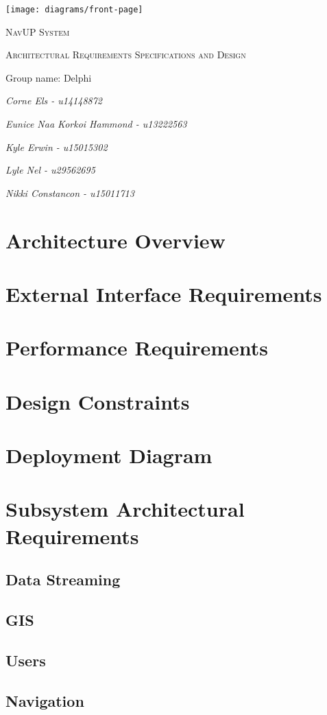 \documentclass{article}
\begin{document}
\begin{titlepage}
	\centering
	\texttt{[image: diagrams/front-page]}
	\vfill
	{\scshape\LARGE NavUP System\par}
	\vfill
	{\scshape\Large Architectural Requirements Specifications and Design\par}
	\vfill
	{\Large Group name: Delphi\par}
	\bigskip 
	{\itshape\Large Corne Els - u14148872\par}	
	{\itshape\Large Eunice Naa Korkoi Hammond - u13222563\par}
	{\itshape\Large Kyle Erwin - u15015302\par}
  {\itshape\Large Lyle Nel - u29562695\par}
	{\itshape\Large Nikki Constancon - u15011713\par}
	\vfill
\end{titlepage}

\tableofcontents

\clearpage

\section{Architecture Overview}


\clearpage
\section{External Interface Requirements}


\clearpage
\section{Performance Requirements}


\clearpage
\section{Design Constraints}


\pagebreak
\section{Deployment Diagram}


\pagebreak
\section{Subsystem Architectural Requirements}
  \subsection{Data Streaming}
	
\clearpage
  \subsection{GIS}
	
\clearpage
  \subsection{Users}
	
\clearpage
  \subsection{Navigation}
	
\end{document}
